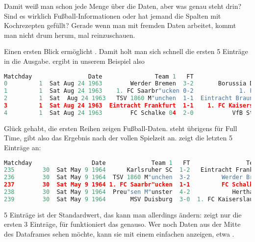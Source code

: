 Damit weiß man schon jede Menge über die Daten, aber was genau steht drin? Sind es wirklich Fußball-Informationen oder hat jemand die Spalten mit Kochrezepten gefüllt? Gerade wenn man mit fremden Daten arbeitet, kommt man nicht drum herum, mal reinzuschauen.

Einen ersten Blick ermöglicht . Damit holt man sich schnell die ersten 5 Einträge in die Ausgabe.  ergibt in unserem Beispiel also

\medskip

{\tiny
\begin{lstlisting}[language=Python]
Matchday                Date               Team 1   FT                  Team 2
0         1  Sat Aug 24 1963        Werder Bremen  3-2       Borussia Dortmund
1         1  Sat Aug 24 1963    1. FC Saarbr"ucken 0-2             1. FC K"oln
2         1  Sat  Aug 24 1963   TSV 1860 M"unchen  1-1  Eintracht Braunschweig
3         1  Sat Aug 24 1963  Eintracht Frankfurt  1-1    1. FC Kaiserslautern
4         1  Sat Aug 24 1963        FC Schalke 04  2-0           VfB Stuttgart
\end{lstlisting}
}

\medskip

Glück gehabt, die ersten Reihen zeigen Fußball-Daten.  steht übrigens für Full Time, gibt also das Ergebnis nach der vollen Spielzeit an.  zeigt die letzten 5 Einträge an:


\medskip

\begin{lstlisting}[language=Python]
Matchday                 Date             Team 1   FT                Team 2
235        30  Sat May 9 1964      Karlsruher SC  1-2   Eintracht Frankfurt
236        30  Sat May 9 1964  TSV 1860 M"unchen  3-2         Werder Bremen
237        30  Sat May 9 1964 1. FC Saarbr"ucken  1-1         FC Schalke 04
238        30  Sat May 9 1964  Preu"sen M"unster  4-2            Hertha BSC
239        30  Sat May 9 1964       MSV Duisburg  3-0  1. FC Kaiserslautern
\end{lstlisting}

\medskip


5 Einträge ist der Standardwert, das kann man allerdings ändern:  zeigt nur die ersten 3 Einträge, für  funktioniert das genauso. Wer noch Daten aus der Mitte des Dataframes sehen möchte, kann sie mit einem einfachen  anzeigen, etwa .

